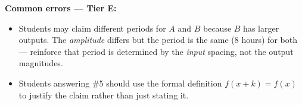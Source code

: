 \documentclass[10pt]{article}
\begin{document}
\begin{teachernote}
\textbf{Common errors --- Tier E:}
\begin{itemize}[leftmargin=1.2em, itemsep=2pt]
  \item Students may claim different periods for $A$ and $B$ because $B$ has
    larger outputs. The \emph{amplitude} differs but the period is the same
    (8 hours) for both --- reinforce that period is determined by the
    \emph{input} spacing, not the output magnitudes.
  \item Students answering \#5 should use the formal definition
    $f(x+k)=f(x)$ to justify the claim rather than just stating it.
\end{itemize}
\end{teachernote}
\end{document}

